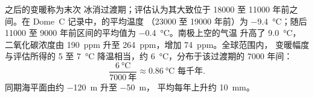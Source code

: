 \begin{example}[末次冰消期]
之后的变暖称为末次
冰消过渡期；评估认为其大致位于 \num{18000} 至
\num{11000} 年前之间。在 Dome~C 记录中，的平均温度
（\num{23000} 至 \num{19000} 年前）为
\qty{-9.4}{\degreeCelsius}；随后 \num{11000} 至
\num{9000} 年前区间的平均值为 \qty{-0.4}{\degreeCelsius}。南极上空的气温
升高了 \qty{9.0}{\degreeCelsius}，二氧化碳浓度由
\qty{190}{ppm} 升至 \qty{264}{ppm}，增加 \qty{74}{ppm}。全球范围内，
变暖幅度与评估所得的 5 至 \qty{7}{\degreeCelsius} 降温相当，约
\qty{6}{\degreeCelsius}，分布于该过渡期的 \num{7000} 年间：
\[
  \frac{\qty{6}{\degreeCelsius}}{\num{7000}\ \text{年}} \approx
  \qty{0.86}{\degreeCelsius} \text{ 每千年.}
\]
同期海平面由约 \qty{-120}{m} 升至 \qty{-50}{m}，
平均每年上升约 \qty{10}{mm}。
\end{example}

